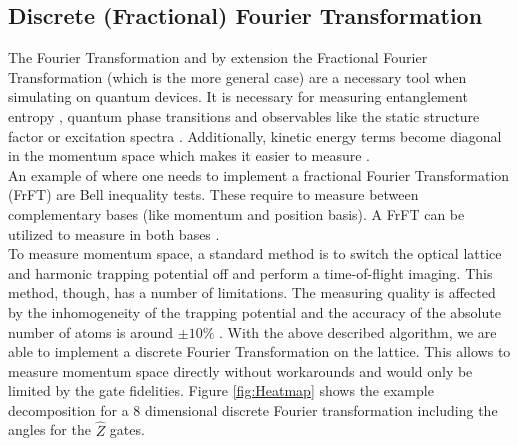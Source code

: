 \subsection{Discrete (Fractional) Fourier Transformation}
The Fourier Transformation and by extension the Fractional Fourier Transformation (which is the more general case) are a necessary tool when simulating on quantum devices. It is necessary for measuring entanglement entropy \cite{pichler2013thermal}, quantum phase transitions \cite{greiner2002quantum} and observables like the static structure factor or excitation spectra \cite{baez2020dynamical}. Additionally, kinetic energy terms become diagonal in the momentum space which makes it easier to measure \cite{halimeh2024universal}.\\
An example of where one needs to implement a fractional Fourier Transformation (FrFT) are Bell inequality tests. These require to measure between complementary bases (like momentum and position basis). A FrFT can be utilized to measure in both bases \cite{tasca2006violation}.\\
To measure momentum space, a standard method is to switch the optical lattice and harmonic trapping potential off and perform a time-of-flight imaging. This method, though, has a number of limitations. The measuring quality is affected by the inhomogeneity of the trapping potential and the accuracy of the absolute number of atoms is around $\pm 10\%$ \cite{Esslinger_2010}. With the above described algorithm, we are able to implement a discrete Fourier Transformation on the lattice. This allows to measure momentum space directly without workarounds and would only be limited by the gate fidelities. Figure \ref{fig:Heatmap} shows the example decomposition for a 8 dimensional discrete Fourier transformation including the angles for the $\widehat{Z}$ gates.
\newpage